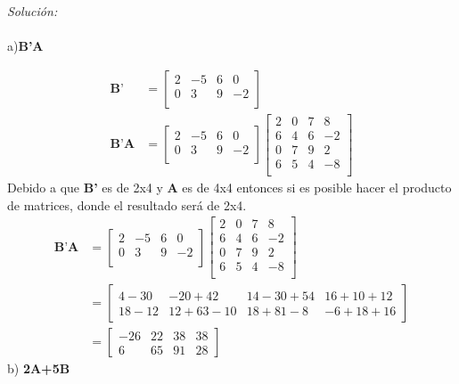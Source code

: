 \documentclass[12pt]{article}
\newenvironment{sol}
    {\emph{Solución:}
    }
    {
    }
\begin{document}
\begin{sol}\\ \\
a)\textbf{B'A}

\begin{align*}
\textbf{B'} &=
	\begin{bmatrix}
		2 & -5 & 6 & 0 \\
		0 & 3 & 9 & -2 \\
	\end{bmatrix}	 \\
\textbf{B'A} &= 
 	\begin{bmatrix}
		2 & -5 & 6 & 0 \\
		0 & 3 & 9 & -2 \\
	\end{bmatrix}
	\begin{bmatrix}
		2 & 0 & 7 & 8\\
		6 & 4 & 6 & -2 \\
		0 & 7 & 9 & 2 \\
		6 & 5 & 4 & -8\\
	\end{bmatrix}
\end{align*}
Debido a que \textbf{B'} es de 2x4 y \textbf{A} es de 4x4 entonces si es posible hacer el producto de matrices, donde el resultado será de 2x4.
\begin{align*}
\textbf{B'A} &= 
 	\begin{bmatrix}
		2 & -5 & 6 & 0 \\
		0 & 3 & 9 & -2 \\
	\end{bmatrix}
	\begin{bmatrix}
		2 & 0 & 7 & 8\\
		6 & 4 & 6 & -2 \\
		0 & 7 & 9 & 2 \\
		6 & 5 & 4 & -8\\
	\end{bmatrix}\\
	&=
	\begin{bmatrix}
		4-30 & -20+42 & 14-30+54 & 16+10+12 \\
		18-12 & 12+63-10 & 18+81-8 & -6+18+16
	\end{bmatrix}\\
	&=
	\begin{bmatrix}
		-26 & 22 & 38 & 38 \\
		6 & 65 & 91 & 28
	\end{bmatrix}
\end{align*}
b) \textbf{2A+5B}\\

\end{sol}
\end{document}
